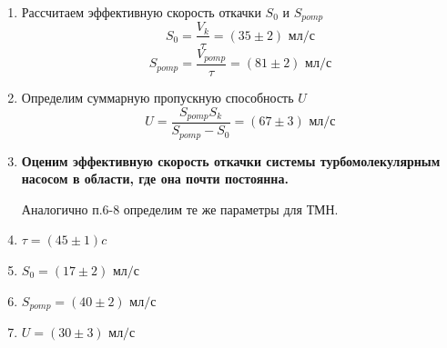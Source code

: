 \documentclass[a4paper, 12pt]{article}%
\begin{document}
\begin{enumerate}
	\begin{figure}[h]
	\end{figure}
	
	\item Рассчитаем эффективную скорость откачки $S_0$ и $S_{pomp}$
	$$ S_0 = \frac{V_k}{\tau} = (35 \pm 2) \text{ мл/с}$$
	$$ S_{pomp} = \frac{V_{pomp}}{\tau} = (81 \pm 2) \text{ мл/с}$$
	
	\item Определим суммарную пропускную способность $U$
	$$ U = \frac{S_{pomp} S_k}{S_{pomp} - S_0}  = (67 \pm 3) \text{ мл/с}$$
	
	\item \textbf{Оценим эффективную скорость откачки системы турбомолекулярным насосом в области, где она почти постоянна.}
	
	
	Аналогично п.6-8 определим те же параметры для ТМН.
	
	\item $\tau = (45 \pm 1) c$
	\item $S_0 = (17 \pm 2)  \text{ мл/с}$
	\item $ S_{pomp} = (40 \pm 2) \text{ мл/с}$
	\item $ U = (30 \pm 3) \text{ мл/с}$
	\newpage
	\begin{figure}[h]
	\end{figure}
	

\end{enumerate}
\end{document}
